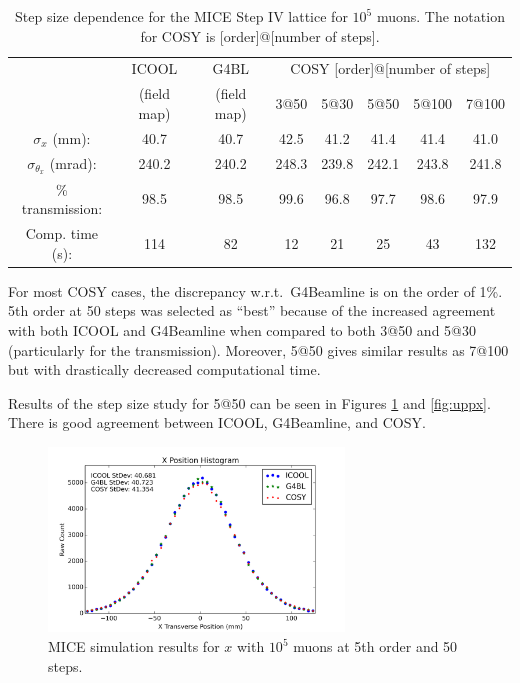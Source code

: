 \begin{table}
\caption[Step size dependence for the MICE Step IV lattice.]{Step size dependence for the MICE Step IV lattice for $10^5$ muons. The notation for COSY is [order]@[number of steps].}
\begin{center}
\begin{tabularx}{\textwidth}{cccccccc}
\hline \hline
& ICOOL & G4BL & \multicolumn{5}{c}{COSY [order]@[number of steps]}\vspace{-12pt}\\
& (field map) & (field map) & 3@50 & 5@30 & 5@50 & 5@100 & 7@100\\
\hline
$\sigma_x$ (mm): & 40.7 & 40.7 & 42.5 & 41.2 & 41.4 & 41.4 & 41.0\\
$\sigma_{\theta_x}$ (mrad): & 240.2 & 240.2 & 248.3 & 239.8 & 242.1 & 243.8 & 241.8\\
\% transmission: & 98.5 & 98.5 & 99.6 & 96.8 & 97.7 & 98.6 & 97.9\\
Comp. time (s): & 114 & 82 & 12 & 21 & 25 & 43 & 132\\
\hline
\end{tabularx}
\end{center}
\label{tbl:mice_step_size_upstream}
\end{table}

For most COSY cases, the discrepancy w.r.t.\ G4Beamline is on the order of 1\%. 5th order at 50 steps was selected as ``best'' because of the increased agreement with both ICOOL and G4Beamline when compared to both 3@50 and 5@30 (particularly for the transmission). Moreover, 5@50 gives similar results as 7@100 but with drastically decreased computational time. 

Results of the step size study for 5@50 can be seen in Figures \ref{fig:upx} and \ref{fig:uppx}. There is good agreement between ICOOL, G4Beamline, and COSY.

\begin{figure}[H]
  \centering
    \includegraphics[width=0.7\textwidth]{MICE data/upstream/x} 
  \caption{MICE simulation results for $x$ with $10^5$ muons at 5th order and 50 steps.}
  \label{fig:upx}
\end{figure}

